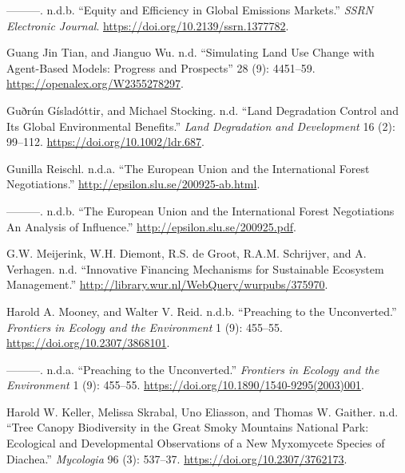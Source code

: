 \begin{CSLReferences}{1}{0}
---------. n.d.b. {``Equity and Efficiency in Global Emissions
Markets.''} \emph{SSRN Electronic Journal}.
\url{https://doi.org/10.2139/ssrn.1377782}.

Guang Jin Tian, and Jianguo Wu. n.d. {``Simulating Land Use Change with
Agent-Based Models: Progress and Prospects''} 28 (9): 4451--59.
\url{https://openalex.org/W2355278297}.

Guðrún Gísladóttir, and Michael Stocking. n.d. {``Land Degradation
Control and Its Global Environmental Benefits.''} \emph{Land Degradation
and Development} 16 (2): 99--112. \url{https://doi.org/10.1002/ldr.687}.

Gunilla Reischl. n.d.a. {``The European Union and the International
Forest Negotiations.''} \url{http://epsilon.slu.se/200925-ab.html}.

---------. n.d.b. {``The European Union and the International Forest
Negotiations An Analysis of Influence.''}
\url{http://epsilon.slu.se/200925.pdf}.

G.W. Meijerink, W.H. Diemont, R.S. de Groot, R.A.M. Schrijver, and A.
Verhagen. n.d. {``Innovative Financing Mechanisms for Sustainable
Ecosystem Management.''}
\url{http://library.wur.nl/WebQuery/wurpubs/375970}.

Harold A. Mooney, and Walter V. Reid. n.d.b. {``Preaching to the
Unconverted.''} \emph{Frontiers in Ecology and the Environment} 1 (9):
455--55. \url{https://doi.org/10.2307/3868101}.

---------. n.d.a. {``Preaching to the Unconverted.''} \emph{Frontiers in
Ecology and the Environment} 1 (9): 455--55.
\url{https://doi.org/10.1890/1540-9295(2003)001}.

Harold W. Keller, Melissa Skrabal, Uno Eliasson, and Thomas W. Gaither.
n.d. {``Tree Canopy Biodiversity in the Great Smoky Mountains National
Park: Ecological and Developmental Observations of a New Myxomycete
Species of Diachea.''} \emph{Mycologia} 96 (3): 537--37.
\url{https://doi.org/10.2307/3762173}.


\end{CSLReferences}
